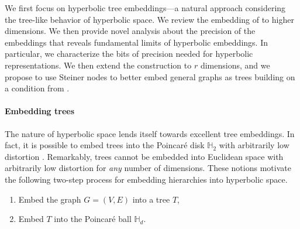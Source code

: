 



We first focus on hyperbolic tree embeddings---a natural approach
considering the tree-like behavior of hyperbolic space.  We
review the embedding of \citet{sarkar} to higher dimensions. We then
provide novel analysis about the precision of the embeddings that
reveals fundamental limits of hyperbolic embeddings. In particular, we
characterize the bits of precision needed for hyperbolic
representations. We then extend the construction to $r$ dimensions,
and we propose to use Steiner nodes to better embed general graphs as
trees building on a condition from \citet{Abraham}.

\paragraph*{Embedding trees} The nature of hyperbolic space lends itself towards excellent tree embeddings. In fact, it is possible to embed trees into the Poincar\'{e} disk $\mathbb{H}_2$ with arbitrarily low distortion \cite{sarkar}. Remarkably, trees cannot be embedded into Euclidean space with arbitrarily low distortion for \emph{any} number of dimensions. These notions motivate the following two-step process for embedding hierarchies into hyperbolic space.
\begin{enumerate}
  \setlength\itemsep{0em}
\item Embed the graph $G=(V,E)$ into a tree $T$,
\item Embed $T$ into the Poincar\'{e} ball $\mathbb{H}_d$.
\end{enumerate}

